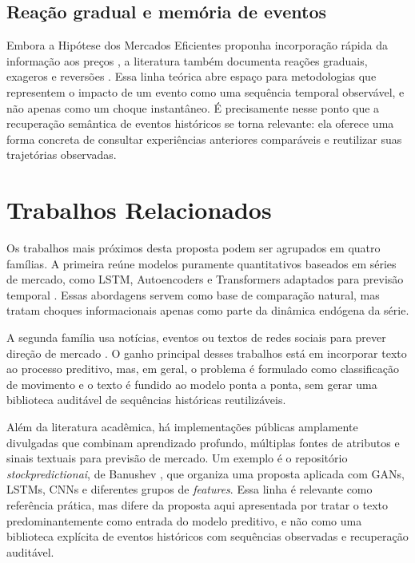 \documentclass[12pt]{article}
\begin{document}
\subsection{Reação gradual e memória de eventos}

Embora a Hipótese dos Mercados Eficientes proponha incorporação rápida da informação aos preços \cite{Fama:1970}, a literatura também documenta reações graduais, exageros e reversões \cite{Cutler:1989, Barberis:1998, Hong:1999}. Essa linha teórica abre espaço para metodologias que representem o impacto de um evento como uma sequência temporal observável, e não apenas como um choque instantâneo. É precisamente nesse ponto que a recuperação semântica de eventos históricos se torna relevante: ela oferece uma forma concreta de consultar experiências anteriores comparáveis e reutilizar suas trajetórias observadas.

\section{Trabalhos Relacionados}

Os trabalhos mais próximos desta proposta podem ser agrupados em quatro famílias. A primeira reúne modelos puramente quantitativos baseados em séries de mercado, como LSTM, Autoencoders e Transformers adaptados para previsão temporal \cite{Fischer:2018, Bao:2017, Lim:2021}. Essas abordagens servem como base de comparação natural, mas tratam choques informacionais apenas como parte da dinâmica endógena da série.

A segunda família usa notícias, eventos ou textos de redes sociais para prever direção de mercado \cite{Ding:2014, Ding:2015, Xu:2018, Sawhney:2020}. O ganho principal desses trabalhos está em incorporar texto ao processo preditivo, mas, em geral, o problema é formulado como classificação de movimento e o texto é fundido ao modelo ponta a ponta, sem gerar uma biblioteca auditável de sequências históricas reutilizáveis.

Além da literatura acadêmica, há implementações públicas amplamente divulgadas que combinam aprendizado profundo, múltiplas fontes de atributos e sinais textuais para previsão de mercado. Um exemplo é o repositório \textit{stockpredictionai}, de Banushev \cite{Banushev:2019}, que organiza uma proposta aplicada com GANs, LSTMs, CNNs e diferentes grupos de \textit{features}. Essa linha é relevante como referência prática, mas difere da proposta aqui apresentada por tratar o texto predominantemente como entrada do modelo preditivo, e não como uma biblioteca explícita de eventos históricos com sequências observadas e recuperação auditável.
\end{document}
